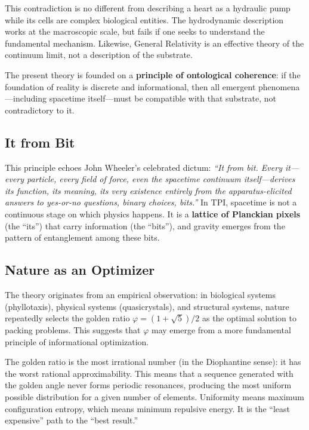 \documentclass[11pt,a4paper]{article}
\theoremstyle{definition}
\begin{document}
This contradiction is no different from describing a heart as a hydraulic pump while its cells are complex biological entities. The hydrodynamic description works at the macroscopic scale, but fails if one seeks to understand the fundamental mechanism. Likewise, General Relativity is an effective theory of the continuum limit, not a description of the substrate.

The present theory is founded on a \textbf{principle of ontological coherence}: if the foundation of reality is discrete and informational, then all emergent phenomena---including spacetime itself---must be compatible with that substrate, not contradictory to it.

\subsection{It from Bit}

This principle echoes John Wheeler's celebrated dictum: \textit{``It from bit. Every it---every particle, every field of force, even the spacetime continuum itself---derives its function, its meaning, its very existence entirely from the apparatus-elicited answers to yes-or-no questions, binary choices, bits.''} In TPI, spacetime is not a continuous stage on which physics happens. It is a \textbf{lattice of Planckian pixels} (the ``its'') that carry information (the ``bits''), and gravity emerges from the pattern of entanglement among these bits.

\subsection{Nature as an Optimizer}

The theory originates from an empirical observation: in biological systems (phyllotaxis), physical systems (quasicrystals), and structural systems, nature repeatedly selects the golden ratio $\varphi = (1+\sqrt{5})/2$ as the optimal solution to packing problems. This suggests that $\varphi$ may emerge from a more fundamental principle of informational optimization.

The golden ratio is the most irrational number (in the Diophantine sense): it has the worst rational approximability. This means that a sequence generated with the golden angle never forms periodic resonances, producing the most uniform possible distribution for a given number of elements. Uniformity means maximum configuration entropy, which means minimum repulsive energy. It is the ``least expensive'' path to the ``best result.''
\end{document}
